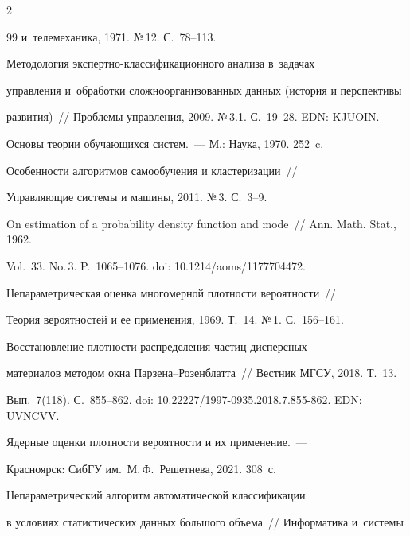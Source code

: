 \begin{multicols}{2}
{{\begin{thebibliography}{99}
и~телемеханика, 1971. №\,12. С.~78--113.




 Методология экс\-перт\-но-клас\-си\-фи\-ка\-ци\-он\-но\-го анализа в~задачах 


управления и~обработки сложноорганизованных данных (история и перспективы 


развития)~// Проб\-ле\-мы управ\-ле\-ния, 2009. №\,3.1. С.~19--28. EDN: \mbox{KJUOIN}.




 Основы теории обучающихся систем.~--- М.: Наука, 1970. 252~c.




 Особенности алгоритмов самообучения и кластеризации~//  


Управ\-ля\-ющие сис\-те\-мы и машины, 2011. №\,3. С.~3--9.




 On estimation of a probability density function and mode~// Ann. Math. Stat., 1962. 


Vol.~33. No.\,3. P.~1065--1076. doi: 10.1214/aoms/1177704472.




 Непараметрическая оценка многомерной плотности вероятности~// 


Теория вероятностей и ее применения, 1969. Т.~14. №\,1. С.~156--161.




 Восстановление плотности распределения частиц дисперсных 


материалов методом окна Пар\-зе\-на--Ро\-зен\-блат\-та~// Вестник МГСУ, 2018. Т.~13. 


Вып.~7(118). С.~855--862. doi: 10.22227/1997-0935.2018.7.855-862. EDN: UVNCVV.




 Ядерные оценки плотности вероятности и их применение.~--- 


Красноярск: СибГУ им.\ М.\,Ф.~Решетнева, 2021. 308~с.




 Непараметрический алгоритм автоматической классификации 


в условиях статистических данных большого объема~// Информатика и~сис\-те\-мы  



\end{thebibliography}}}
\end{multicols}
